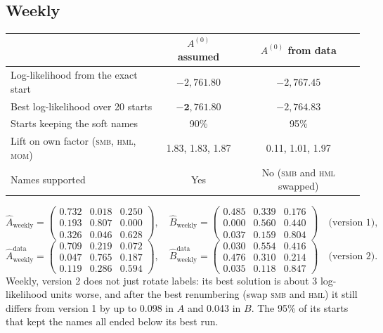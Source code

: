 \documentclass[11pt]{article}
\newcommand{\SMB}{\textsc{smb}}
\newcommand{\HML}{\textsc{hml}}
\newcommand{\MOM}{\textsc{mom}}
\begin{document}
\subsection{Weekly}
\begin{center}
\begin{tabular}{lcc}
\toprule
 & $A^{(0)}$ assumed & $A^{(0)}$ from data \\
\midrule
Log-likelihood from the exact start & $-2{,}761.80$ & $-2{,}767.45$ \\
Best log-likelihood over 20 starts & $\mathbf{-2{,}761.80}$ & $-2{,}764.83$ \\
Starts keeping the soft names & 90\% & 95\% \\
Lift on own factor (\SMB, \HML, \MOM) & 1.83, 1.83, 1.87 & 0.11, 1.01, 1.97 \\
Names supported & Yes & No (\SMB{} and \HML{} swapped) \\
\bottomrule
\end{tabular}
\end{center}
\[
\hat A_{\text{weekly}}=
\begin{pmatrix}
0.732 & 0.018 & 0.250\\
0.193 & 0.807 & 0.000\\
0.326 & 0.046 & 0.628
\end{pmatrix},
\quad
\hat B_{\text{weekly}}=
\begin{pmatrix}
0.485 & 0.339 & 0.176\\
0.000 & 0.560 & 0.440\\
0.037 & 0.159 & 0.804
\end{pmatrix}
\quad\text{(version 1)},
\]
\[
\hat A^{\text{data}}_{\text{weekly}}=
\begin{pmatrix}
0.709 & 0.219 & 0.072\\
0.047 & 0.765 & 0.187\\
0.119 & 0.286 & 0.594
\end{pmatrix},
\quad
\hat B^{\text{data}}_{\text{weekly}}=
\begin{pmatrix}
0.030 & 0.554 & 0.416\\
0.476 & 0.310 & 0.214\\
0.035 & 0.118 & 0.847
\end{pmatrix}
\quad\text{(version 2)}.
\]
Weekly, version 2 does not just rotate labels: its best solution is about 3 log-likelihood units worse, and after the best renumbering (swap \SMB{} and \HML) it still differs from version 1 by up to 0.098 in $A$ and 0.043 in $B$. The 95\% of its starts that kept the names all ended below its best run.
\end{document}
